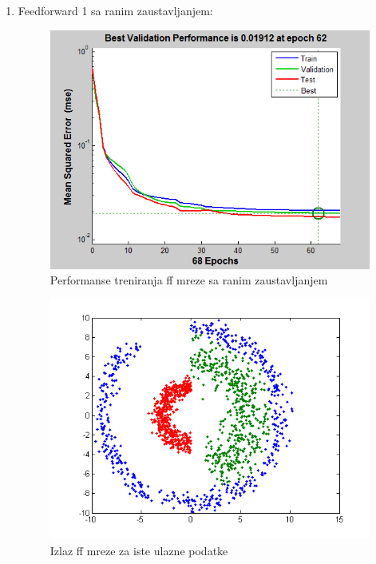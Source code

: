 \documentclass{report}
\begin{document}
\begin{enumerate}
\begin{enumerate}
\newpage
\item\LARGE
Feedforward 1 sa ranim zaustavljanjem:\large

\begin{figure}[!h]
\begin{center}
\includegraphics[scale=0.8]{B1performanceFF1early.png}
\caption{Performanse treniranja ff mreze sa ranim zaustavljanjem}
\end{center}
\end{figure}

\begin{figure}[!h]
\begin{center}
\includegraphics[scale=0.8]{B1outputFF1earlySame.png}
\caption{Izlaz ff mreze za iste ulazne podatke}
\end{center}
\end{figure}


\end{enumerate}
\end{enumerate}
\end{document}
